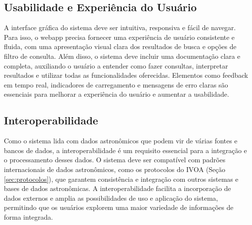 \subsection{Usabilidade e Experiência do Usuário}
\label{sec:req-ux}

A interface gráfica do sistema deve ser intuitiva, responsiva e fácil de navegar. Para isso, o webapp precisa fornecer uma experiência de usuário consistente e fluida, com uma apresentação visual clara dos resultados de busca e opções de filtro de consulta. Além disso, o sistema deve incluir uma documentação clara e completa, auxiliando o usuário a entender como fazer consultas, interpretar resultados e utilizar todas as funcionalidades oferecidas. Elementos como feedback em tempo real, indicadores de carregamento e mensagens de erro claras são essenciais para melhorar a experiência do usuário e aumentar a usabilidade.






\subsection{Interoperabilidade}
\label{sec:req-inter}

Como o sistema lida com dados astronômicos que podem vir de várias fontes e bancos de dados, a interoperabilidade é um requisito essencial para a integração e o processamento desses dados. O sistema deve ser compatível com padrões internacionais de dados astronômicos, como os protocolos do IVOA (Seção \ref{sec:protocolos}), que garantem consistência e integração com outros sistemas e bases de dados astronômicas. A interoperabilidade facilita a incorporação de dados externos e amplia as possibilidades de uso e aplicação do sistema, permitindo que os usuários explorem uma maior variedade de informações de forma integrada.

